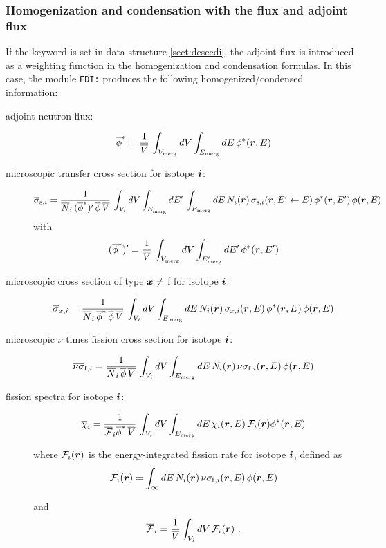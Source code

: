 \subsubsection{Homogenization and condensation with the flux and adjoint flux}\label{sect:prod}

If the  keyword is set in data structure \ref{sect:descedi}, the adjoint flux is introduced as a weighting function in the
homogenization and condensation formulas. In this case, the module {\tt EDI:} produces the following homogenized/condensed information:

\begin{description}

\item[adjoint neutron flux:]
$$
\overline\phi^* = {1\over \overline V} \, \int_{V_{\rm merg}} dV \int_{E_{\rm merg}} dE \, \phi^*(\bff(r),E)
$$

\item[microscopic transfer cross section for isotope $\bff(i)$:]
$$
\overline \sigma_{{\rm s},i} ={ 1 \over \overline N_i\, (\overline\phi^*)' \, \overline\phi \, \overline V} \, \int_{V_i} dV \int_{E'_{\rm merg}} dE' \,\int_{E_{\rm merg}} dE \, N_i(\bff(r)) \, \sigma_{{\rm s},i}(\bff(r),E' \leftarrow E) \, \phi^*(\bff(r),E') \, \phi(\bff(r),E)
$$
\noindent with
$$
(\overline\phi^*)' = {1\over \overline V} \, \int_{V_{\rm merg}} dV \int_{E'_{\rm merg}} dE' \, \phi^*(\bff(r),E')
$$

\item[microscopic cross section of type $\bff(x)\neq$ f for isotope $\bff(i)$:]
$$
\overline \sigma_{x,i} ={ 1 \over \overline N_i\, \overline\phi^* \, \overline\phi \, \overline V} \, \int_{V_i} dV \int_{E_{\rm merg}} dE \, N_i(\bff(r)) \, \sigma_{x,i}(\bff(r),E) \, \phi^*(\bff(r),E) \, \phi(\bff(r),E)
$$

\item[microscopic $\nu$ times fission cross section for isotope $\bff(i)$:]
$$
\overline\nu\overline\sigma_{{\rm f},i} ={ 1 \over \overline N_i\, \overline\phi \, \overline V} \, \int_{V_i} dV \int_{E_{\rm merg}} dE \, N_i(\bff(r)) \, \nu\sigma_{{\rm f},i}(\bff(r),E) \, \phi(\bff(r),E)
$$

\item[fission spectra for isotope $\bff(i)$:]
$$
\overline\chi_{i} ={ 1 \over \overline{\cal F}_i \overline\phi^* \, \overline V} \, \int_{V_i} dV \int_{E_{\rm merg}} dE \, \chi_{i}(\bff(r),E) \, {\cal F}_i(\bff(r)) \phi^*(\bff(r),E)
$$

\noindent where ${\cal F}_i(\bff(r))$ is the energy-integrated fission rate for isotope $\bff(i)$, defined as
$$
{\cal F}_i(\bff(r))=\int_\infty dE \, N_i(\bff(r)) \, \nu\sigma_{{\rm f},i}(\bff(r),E) \, \phi(\bff(r),E)
$$

\noindent and
$$
\overline{\cal F}_i={1\over \overline V} \int_{V_i} dV \, {\cal F}_i(\bff(r)) \ .
$$
\end{description}

